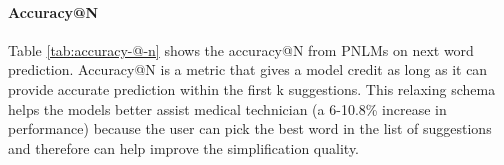 \documentclass[11pt]{article}
\newcommand{\todo}[1]{\textcolor{red}{TODO: #1}}
\begin{document}
\paragraph{Accuracy@N}

Table \ref{tab:accuracy-@-n} shows the accuracy@N from PNLMs on next word prediction. Accuracy@N is a metric that gives a model credit as long as it can provide accurate prediction within the first k suggestions. This relaxing schema helps the models better assist medical technician (a 6-10.8\% increase in performance) because the user can pick the best word in the list of suggestions and therefore can help improve the simplification quality.

\begin{table}[t]
\centering
{}
\caption{\label{tab:accuracy-@-n} Accuracy @ N of the RoBERTa, BERT, and XLNet with context on next word prediction \todo{Add GPT-2}}
\end{table}


\end{document}
